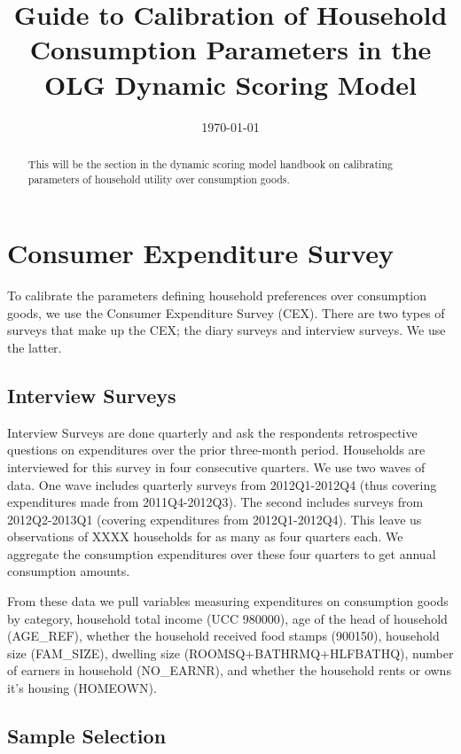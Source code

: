 \documentclass[article,11pt,letterpaper,fleqn]{article}
\title{Guide to Calibration of Household Consumption Parameters in the OLG Dynamic Scoring Model}
\date{\today}
\theoremstyle{definition}
\numberwithin{equation}{section}
\begin{document}

\maketitle



\begin{abstract}
This will be the section in the dynamic scoring model handbook on calibrating parameters of household utility over consumption goods.
\end{abstract}

\section{Consumer Expenditure Survey}

To calibrate the parameters defining household preferences over consumption goods, we use the Consumer Expenditure Survey (CEX).  There are two types of surveys that make up the CEX; the diary surveys and interview surveys.  We use the latter.  

\subsection{Interview Surveys}

Interview Surveys are done quarterly and ask the respondents retrospective questions on expenditures over the prior three-month period.  Households are interviewed for this survey in four consecutive quarters.  We use two waves of data.  One wave includes quarterly surveys from 2012Q1-2012Q4 (thus covering expenditures made from 2011Q4-2012Q3). The second includes surveys from 2012Q2-2013Q1 (covering expenditures from 2012Q1-2012Q4).  This leave us observations of XXXX households for as many as four quarters each.  We aggregate the consumption expenditures over these four quarters to get annual consumption amounts.

From these data we pull variables measuring expenditures on consumption goods by category, household total income (UCC 980000), age of the head of household (AGE\_REF), whether the household received food stamps (900150), household size (FAM\_SIZE), dwelling size (ROOMSQ+BATHRMQ+HLFBATHQ), number of earners in household (NO\_EARNR), and whether the household rents or owns it's housing (HOMEOWN).

\subsection{Sample Selection}
\end{document}
